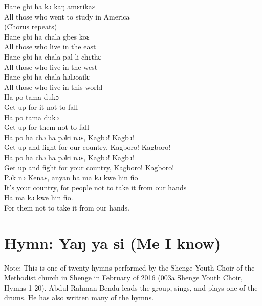 Hane gbi ha kɔ kaŋ amɛrikaɛ\\
All those who went to study in America\\

(Chorus repeats)\\

Hane gbi ha chala gbes koɛ\\
All those who live in the east\\

Hane gbi ha chala pal li chɛthɛ\\
All those who live in the west\\

Hane gbi ha chala hɔlɔoailɛ\\
All those who live in this world\\

Ha po tama dukɔ\\
Get up for it not to fall\\

Ha po tama dukɔ\\
Get up for them not to fall\\

\newpage
Ha po ha chɔ ha pɔki nɔɛ, Kagbɔ! Kagbɔ!\\
Get up and fight for our country, Kagboro! Kagboro!\\

Ha po ha chɔ ha pɔki nɔɛ, Kagbɔ! Kagbɔ!\\
Get up and fight for your country, Kagboro! Kagboro!\\

Pɔk nɔ Kenaɛ, anyan ha ma kɔ kwe hin fio\\
It's your country, for people not to take it from our hands\\

Ha ma kɔ kwe hin fio.\\
For them not to take it from our hands.\\

\section{Hymn: Yaŋ ya si (Me I know)}
\hypertarget{Toc115517833}{}
Note: This is one of twenty hymns performed by the Shenge Youth Choir of the Methodist church in Shenge in February of 2016 (003a Shenge Youth Choir, Hymns 1-20). Abdul Rahman Bendu leads the group, sings, and plays one of the drums. He has also written many of the hymns.\\

